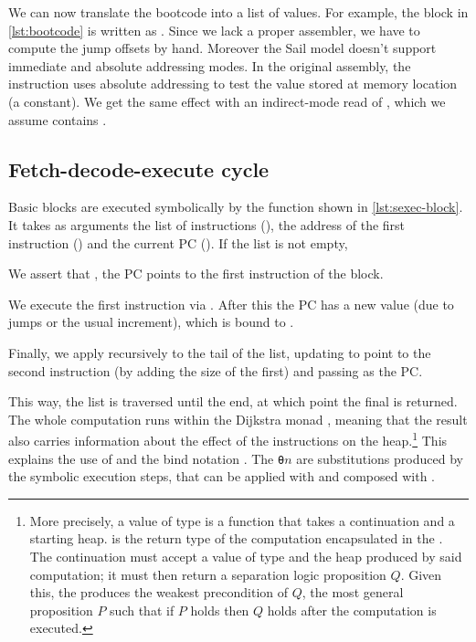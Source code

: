 We can now translate the bootcode into a list of  values. For example, the  block in \cref{lst:bootcode} is written as . Since we lack a proper assembler, we have to compute the jump offsets by hand. Moreover the Sail model doesn't support immediate and absolute addressing modes. In the original assembly, the  instruction uses absolute addressing to test the value stored at memory location  (a constant). We get the same effect with an indirect-mode read of , which we assume contains .

\subsection{Fetch-decode-execute cycle}

Basic blocks are executed symbolically by the  function shown in \cref{lst:sexec-block}. It takes as arguments the list of instructions (), the address of the first instruction () and the current PC (). If the list is not empty,
\begin{labeling}{}
\item[\circref{sexec-block-1}] We assert that , \ie the PC points to the first instruction of the block.
\item[\circref{sexec-block-2}] We execute the first instruction via . After this the PC has a new value (due to jumps or the usual increment), which is bound to .
\item[\circref{sexec-block-3}] Finally, we apply  recursively to the tail of the list, updating  to point to the second instruction (by adding the size of the first) and passing  as the PC.
\end{labeling}

This way, the list is traversed until the end, at which point the final  is returned. The whole computation runs within the Dijkstra monad  \cite{Keuchel2022}, meaning that the result also carries information about the effect of the instructions on the heap.\footnote{More precisely, a value of type  is a function that takes a continuation and a starting heap.  is the return type of the computation encapsulated in the . The continuation must accept a value of type  and the heap produced by said computation; it must then return a separation logic proposition \(Q\). Given this, the  produces the weakest precondition of \(Q\), \ie the most general proposition \(P\) such that if \(P\) holds then \(Q\) holds after the computation is executed.} This explains the use of  and the bind notation . The \texttt{θ}\(n\) are substitutions produced by the symbolic execution steps, that can be applied with  and composed with .


